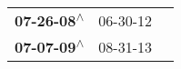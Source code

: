 \begin{supertabular}{lll}
 \textbf{07-26-08\textsuperscript{$\wedge$}} &  06-30-12\textsuperscript{} \\
 \textbf{07-07-09\textsuperscript{$\wedge$}} &  08-31-13\textsuperscript{} \\
\end{supertabular}
